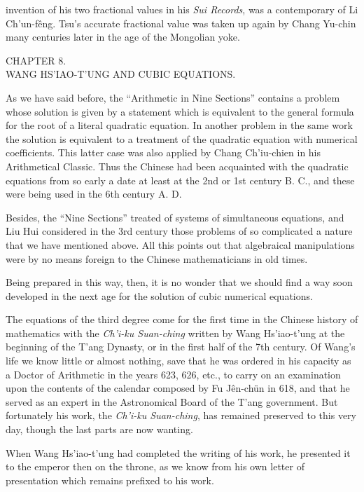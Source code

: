 \documentclass[11pt]{article}
\newcommand{\scanpage}[2]{\clearpage\setcounter{footnote}{0}\noindent{\footnotesize\color{gray}PDF page #1 · #2}\par\medskip}
\newcommand{\scanfooter}{}
\begin{document}
\scanpage{0067}{Chapter 8, printed page 53}
invention of his two fractional values in his \emph{Sui Records}, was a contemporary of Li Ch'un-fêng. Tsu's accurate fractional value was taken up again by Chang Yu-chin many centuries later in the age of the Mongolian yoke.

\begin{center}
CHAPTER 8.\\
WANG HS'IAO-T'UNG AND CUBIC EQUATIONS.
\end{center}

As we have said before, the ``Arithmetic in Nine Sections'' contains a problem whose solution is given by a statement which is equivalent to the general formula for the root of a literal quadratic equation. In another problem in the same work the solution is equivalent to a treatment of the quadratic equation with numerical coefficients. This latter case was also applied by Chang Ch'iu-chien in his Arithmetical Classic. Thus the Chinese had been acquainted with the quadratic equations from so early a date at least at the 2nd or 1st century B. C., and these were being used in the 6th century A. D.

Besides, the ``Nine Sections'' treated of systems of simultaneous equations, and Liu Hui considered in the 3rd century those problems of so complicated a nature that we have mentioned above. All this points out that algebraical manipulations were by no means foreign to the Chinese mathematicians in old times.

Being prepared in this way, then, it is no wonder that we should find a way soon developed in the next age for the solution of cubic numerical equations.

The equations of the third degree come for the first time in the Chinese history of mathematics with the \emph{Ch'i-ku Suan-ching} written by Wang Hs'iao-t'ung at the beginning of the T'ang Dynasty, or in the first half of the 7th century. Of Wang's life we know little or almost nothing, save that he was ordered in his capacity as a Doctor of Arithmetic in the years 623, 626, etc., to carry on an examination upon the contents of the calendar composed by Fu Jên-chün in 618, and that he served as an expert in the Astronomical Board of the T'ang government. But fortunately his work, the \emph{Ch'i-ku Suan-ching}, has remained preserved to this very day, though the last parts are now wanting.

When Wang Hs'iao-t'ung had completed the writing of his work, he presented it to the emperor then on the throne, as we know from his own letter of presentation which remains prefixed to his work.
\scanfooter
\end{document}
